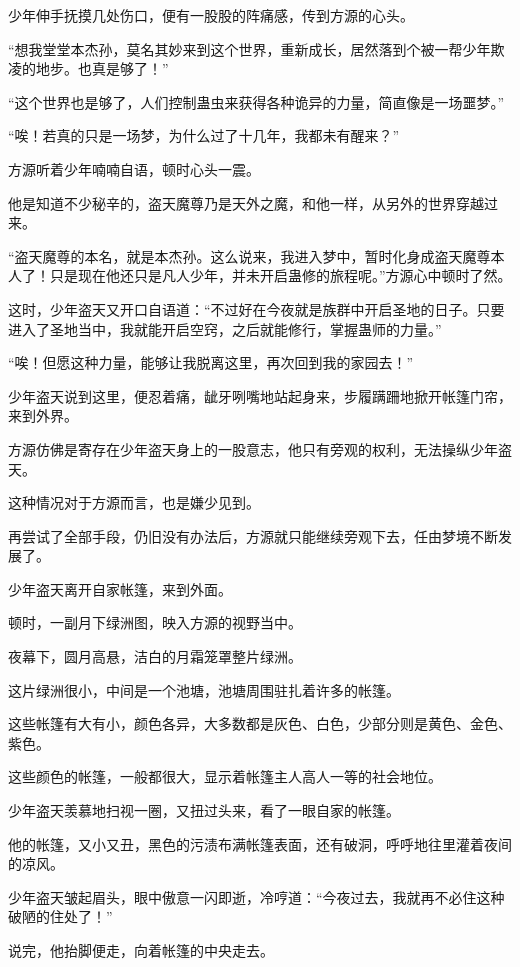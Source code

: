 \begin{this_body}
少年伸手抚摸几处伤口，便有一股股的阵痛感，传到方源的心头。

“想我堂堂本杰孙，莫名其妙来到这个世界，重新成长，居然落到个被一帮少年欺凌的地步。也真是够了！”

“这个世界也是够了，人们控制蛊虫来获得各种诡异的力量，简直像是一场噩梦。”

“唉！若真的只是一场梦，为什么过了十几年，我都未有醒来？”

方源听着少年喃喃自语，顿时心头一震。

他是知道不少秘辛的，盗天魔尊乃是天外之魔，和他一样，从另外的世界穿越过来。

“盗天魔尊的本名，就是本杰孙。这么说来，我进入梦中，暂时化身成盗天魔尊本人了！只是现在他还只是凡人少年，并未开启蛊修的旅程呢。”方源心中顿时了然。

这时，少年盗天又开口自语道：“不过好在今夜就是族群中开启圣地的日子。只要进入了圣地当中，我就能开启空窍，之后就能修行，掌握蛊师的力量。”

“唉！但愿这种力量，能够让我脱离这里，再次回到我的家园去！”

少年盗天说到这里，便忍着痛，龇牙咧嘴地站起身来，步履蹒跚地掀开帐篷门帘，来到外界。

方源仿佛是寄存在少年盗天身上的一股意志，他只有旁观的权利，无法操纵少年盗天。

这种情况对于方源而言，也是嫌少见到。

再尝试了全部手段，仍旧没有办法后，方源就只能继续旁观下去，任由梦境不断发展了。

少年盗天离开自家帐篷，来到外面。

顿时，一副月下绿洲图，映入方源的视野当中。

夜幕下，圆月高悬，洁白的月霜笼罩整片绿洲。

这片绿洲很小，中间是一个池塘，池塘周围驻扎着许多的帐篷。

这些帐篷有大有小，颜色各异，大多数都是灰色、白色，少部分则是黄色、金色、紫色。

这些颜色的帐篷，一般都很大，显示着帐篷主人高人一等的社会地位。

少年盗天羡慕地扫视一圈，又扭过头来，看了一眼自家的帐篷。

他的帐篷，又小又丑，黑色的污渍布满帐篷表面，还有破洞，呼呼地往里灌着夜间的凉风。

少年盗天皱起眉头，眼中傲意一闪即逝，冷哼道：“今夜过去，我就再不必住这种破陋的住处了！”

说完，他抬脚便走，向着帐篷的中央走去。


\end{this_body}
